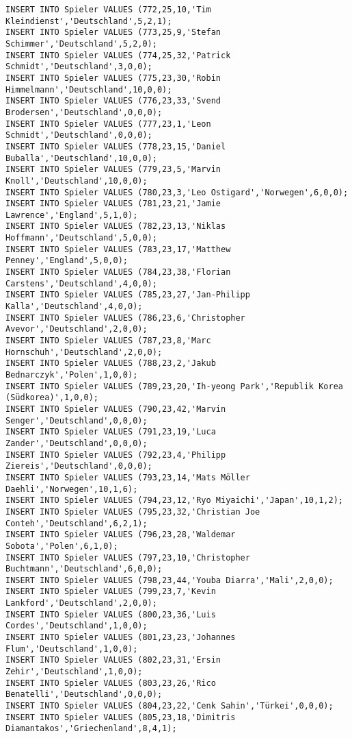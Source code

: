 \documentclass{lehramt-informatik-aufgabe}
\begin{document}
\begin{verbatim}
INSERT INTO Spieler VALUES (772,25,10,'Tim Kleindienst','Deutschland',5,2,1);
INSERT INTO Spieler VALUES (773,25,9,'Stefan Schimmer','Deutschland',5,2,0);
INSERT INTO Spieler VALUES (774,25,32,'Patrick Schmidt','Deutschland',3,0,0);
INSERT INTO Spieler VALUES (775,23,30,'Robin Himmelmann','Deutschland',10,0,0);
INSERT INTO Spieler VALUES (776,23,33,'Svend Brodersen','Deutschland',0,0,0);
INSERT INTO Spieler VALUES (777,23,1,'Leon Schmidt','Deutschland',0,0,0);
INSERT INTO Spieler VALUES (778,23,15,'Daniel Buballa','Deutschland',10,0,0);
INSERT INTO Spieler VALUES (779,23,5,'Marvin Knoll','Deutschland',10,0,0);
INSERT INTO Spieler VALUES (780,23,3,'Leo Ostigard','Norwegen',6,0,0);
INSERT INTO Spieler VALUES (781,23,21,'Jamie Lawrence','England',5,1,0);
INSERT INTO Spieler VALUES (782,23,13,'Niklas Hoffmann','Deutschland',5,0,0);
INSERT INTO Spieler VALUES (783,23,17,'Matthew Penney','England',5,0,0);
INSERT INTO Spieler VALUES (784,23,38,'Florian Carstens','Deutschland',4,0,0);
INSERT INTO Spieler VALUES (785,23,27,'Jan-Philipp Kalla','Deutschland',4,0,0);
INSERT INTO Spieler VALUES (786,23,6,'Christopher Avevor','Deutschland',2,0,0);
INSERT INTO Spieler VALUES (787,23,8,'Marc Hornschuh','Deutschland',2,0,0);
INSERT INTO Spieler VALUES (788,23,2,'Jakub Bednarczyk','Polen',1,0,0);
INSERT INTO Spieler VALUES (789,23,20,'Ih-yeong Park','Republik Korea (Südkorea)',1,0,0);
INSERT INTO Spieler VALUES (790,23,42,'Marvin Senger','Deutschland',0,0,0);
INSERT INTO Spieler VALUES (791,23,19,'Luca Zander','Deutschland',0,0,0);
INSERT INTO Spieler VALUES (792,23,4,'Philipp Ziereis','Deutschland',0,0,0);
INSERT INTO Spieler VALUES (793,23,14,'Mats Möller Daehli','Norwegen',10,1,6);
INSERT INTO Spieler VALUES (794,23,12,'Ryo Miyaichi','Japan',10,1,2);
INSERT INTO Spieler VALUES (795,23,32,'Christian Joe Conteh','Deutschland',6,2,1);
INSERT INTO Spieler VALUES (796,23,28,'Waldemar Sobota','Polen',6,1,0);
INSERT INTO Spieler VALUES (797,23,10,'Christopher Buchtmann','Deutschland',6,0,0);
INSERT INTO Spieler VALUES (798,23,44,'Youba Diarra','Mali',2,0,0);
INSERT INTO Spieler VALUES (799,23,7,'Kevin Lankford','Deutschland',2,0,0);
INSERT INTO Spieler VALUES (800,23,36,'Luis Cordes','Deutschland',1,0,0);
INSERT INTO Spieler VALUES (801,23,23,'Johannes Flum','Deutschland',1,0,0);
INSERT INTO Spieler VALUES (802,23,31,'Ersin Zehir','Deutschland',1,0,0);
INSERT INTO Spieler VALUES (803,23,26,'Rico Benatelli','Deutschland',0,0,0);
INSERT INTO Spieler VALUES (804,23,22,'Cenk Sahin','Türkei',0,0,0);
INSERT INTO Spieler VALUES (805,23,18,'Dimitris Diamantakos','Griechenland',8,4,1);

\end{verbatim}
\end{document}
